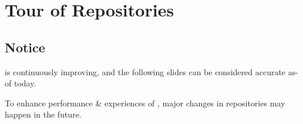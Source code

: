 \section{Tour of \taoceorg Repositories}
\subsection{Notice}
\begin{frame}
    \taoce is continuously improving, and the following slides can be considered accurate as-of today.\\
   
    \bigicon{\faRefresh}

    To enhance performance \& experiences of \TAOCE, major changes in \taoceorg repositories may happen in the future.
\end{frame}

